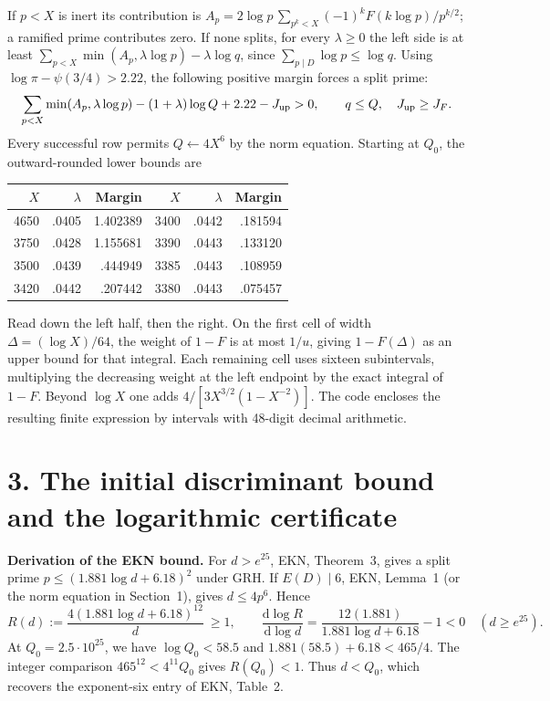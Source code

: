 \documentclass[11pt,letterpaper]{article}
\begin{document}
If \(p<X\) is inert its contribution is
\(A_p=2\log p\,\sum_{p^k<X}(-1)^k F(k\log p)/p^{k/2}\); a ramified prime
contributes zero. If none splits, for every \(\lambda\ge0\) the left side is at least
\(\sum_{p<X}\min(A_p,\lambda\log p)-\lambda\log q\), since
\(\sum_{p\mid D}\log p\le\log q\). Using
\(\log\pi-\psi(3/4)>2.22\), the following positive margin forces a split prime:
\[
   \sum_{p<X}\min(A_p,\lambda\log p)-(1+\lambda)\log Q+2.22-J_{\rm up}>0,
   \qquad q\le Q,\quad J_{\rm up}\ge J_F .
\]
Every successful row permits \(Q\gets4X^6\) by the norm equation.
Starting at \(Q_0\), the outward-rounded lower bounds are
\begin{center}
\begin{tabular}{rrr@{\qquad\qquad}rrr}
\toprule \(X\)&\(\lambda\)&Margin&\(X\)&\(\lambda\)&Margin\\\midrule
4650&.0405&1.402389&3400&.0442&.181594\\
3750&.0428&1.155681&3390&.0443&.133120\\
3500&.0439&.444949&3385&.0443&.108959\\
3420&.0442&.207442&3380&.0443&.075457\\\bottomrule
\end{tabular}
\end{center}
Read down the left half, then the right. On the first cell of width
\(\Delta=(\log X)/64\), the weight of \(1-F\) is at most \(1/u\), giving
\(1-F(\Delta)\) as an upper bound for that integral. Each remaining cell
uses sixteen subintervals, multiplying the decreasing weight at the left
endpoint by the exact integral of \(1-F\). Beyond \(\log X\) one adds
\(4/[3X^{3/2}(1-X^{-2})]\). The code encloses the resulting finite
expression by intervals with 48-digit decimal arithmetic.

\newpage
\section*{3. The initial discriminant bound and the logarithmic certificate}
\textbf{Derivation of the EKN bound.}
For \(d>e^{25}\), EKN, Theorem~3, gives a split prime
\(p\le(1.881\log d+6.18)^2\) under GRH. If \(E(D)\mid6\), EKN,
Lemma~1 (or the norm equation in Section~1), gives \(d\le4p^6\). Hence
\[
 R(d):=\frac{4(1.881\log d+6.18)^{12}}{d}\ \ge 1,\qquad
 \frac{\mathrm d\log R}{\mathrm d\log d}=\frac{12(1.881)}{1.881\log d+6.18}-1<0
 \quad (d\ge e^{25}).
\]
At \(Q_0=2.5\cdot10^{25}\), we have \(\log Q_0<58.5\) and
\(1.881(58.5)+6.18<465/4\). The integer comparison
\(465^{12}<4^{11}Q_0\) gives \(R(Q_0)<1\). Thus \(d<Q_0\), which
recovers the exponent-six entry of EKN, Table~2.
\end{document}

